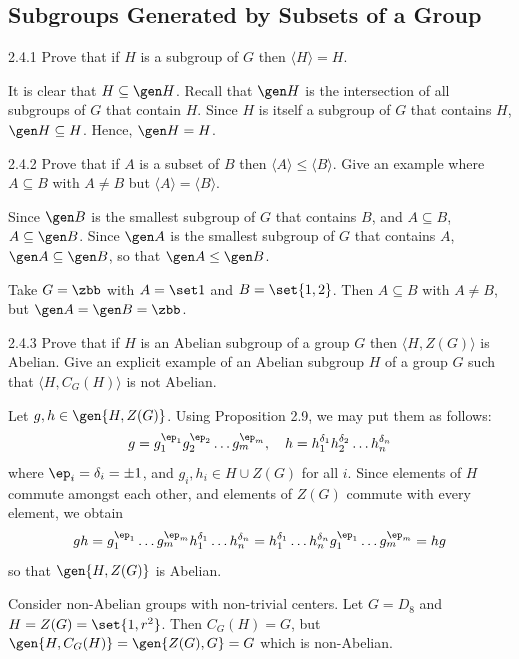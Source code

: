 \subsection{Subgroups Generated by Subsets of a Group}

\begin{exercise}{2.4.1}
    Prove that if $H$ is a subgroup of $G$ then $\langle H\rangle = H$.
\end{exercise}

\begin{sol}
    It is clear that $H \subseteq \gen H$.
	Recall that $\gen H$ is the intersection of all subgroups of $G$ that contain $H$.
	Since $H$ is itself a subgroup of $G$ that contains $H$, $\gen H \subseteq H$.
	Hence, $\gen H = H$.
\end{sol}

\begin{exercise}{2.4.2}
    Prove that if $A$ is a subset of $B$ then $\langle A\rangle \le \langle B\rangle$.
	Give an example where $A \subseteq B$ with $A \ne B$ but $\langle A\rangle = \langle B\rangle$.
\end{exercise}

\begin{sol}
    Since $\gen B$ is the smallest subgroup of $G$ that contains $B$, and $A \subseteq B$, $A \subseteq \gen B$.
	Since $\gen A$ is the smallest subgroup of $G$ that contains $A$, $\gen A \subseteq \gen B$, so that $\gen A \leq \gen B$.

    Take $G = \zbb$ with $A = \set 1$ and $B = \set{1, 2}$.
	Then $A \subseteq B$ with $A \ne B$, but $\gen A = \gen B = \zbb$.
\end{sol}

\begin{exercise}{2.4.3}
    Prove that if $H$ is an Abelian subgroup of a group $G$ then $\langle H, Z(G)\rangle$ is Abelian.
	Give an explicit example of an Abelian subgroup $H$ of a group $G$ such that $\langle H, C_G(H)\rangle$ is not Abelian.
\end{exercise}

\begin{sol}
    Let $g, h \in \gen{H, Z(G)}$.
	Using Proposition 2.9, we may put them as follows:
    \[
    	g = g_1^{\ep_1}g_2^{\ep_2} \ldots g_m^{\ep_m}, \quad h = h_1^{\delta_1}h_2^{\delta_2} \ldots h_n^{\delta_n}
    \]
    where $\ep_i = \delta_i = \pm 1$, and $g_i, h_i \in H \cup Z(G)$ for all $i$.
	Since elements of $H$ commute amongst each other, and elements of $Z(G)$ commute with every element, we obtain
    \[
    	gh = g_1^{\ep_1} \ldots g_m^{\ep_m}h_1^{\delta_1} \ldots h_n^{\delta_n} = h_1^{\delta_1} \ldots h_n^{\delta_n}g_1^{\ep_1} \ldots g_m^{\ep_m} = hg
    \]
    so that $\gen{H, Z(G)}$ is Abelian.

    Consider non-Abelian groups with non-trivial centers.
	Let $G = D_8$ and $H = Z(G) = \set{1, r^2}$.
	Then $C_G(H) = G$, but $\gen{H, C_G(H)} = \gen{Z(G), G} = G$ which is non-Abelian.
\end{sol}

